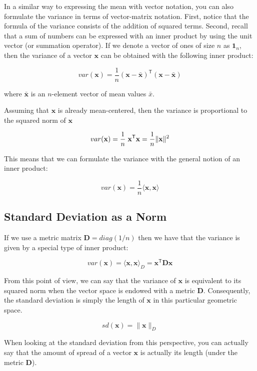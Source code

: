 \documentclass[]{book}
\begin{document}
In a similar way to expressing the mean with vector notation, you can also
formulate the variance in terms of vector-matrix notation. First, notice that
the formula of the variance consists of the addition of squared terms.
Second, recall that a sum of numbers can be expressed with an inner product by
using the unit vector (or summation operator). If we denote a vector of ones of
size \(n\) as \(\mathbf{1}_{n}\), then the variance of a vector \(\mathbf{x}\) can be
obtained with the following inner product:

\[
var(\mathbf{x}) = \frac{1}{n} (\mathbf{x} - \mathbf{\bar{x}})^\mathsf{T} (\mathbf{x} - \mathbf{\bar{x}})
\]

where \(\mathbf{\bar{x}}\) is an \(n\)-element vector of mean values \(\bar{x}\).

Assuming that \(\mathbf{x}\) is already mean-centered, then the variance is
proportional to the squared norm of \(\mathbf{x}\)

\[
var(\mathbf{x}) = \frac{1}{n} \hspace{1mm} \mathbf{x}^{\mathsf{T}} \mathbf{x} = \frac{1}{n} \| \mathbf{x} \|^2
\]

This means that we can formulate the variance with the general notion of an
inner product:

\[
var(\mathbf{x}) = \frac{1}{n} \langle \mathbf{x}, \mathbf{x} \rangle
\]

\hypertarget{standard-deviation-as-a-norm}{%
\subsection{Standard Deviation as a Norm}\label{standard-deviation-as-a-norm}}

If we use a metric matrix \(\mathbf{D} = diag(1/n)\) then we have that the variance
is given by a special type of inner product:

\[
var(\mathbf{x}) = \langle \mathbf{x}, \mathbf{x} \rangle_{D} = \mathbf{x}^{\mathsf{T}} \mathbf{D x}
\]

From this point of view, we can say that the variance of \(\mathbf{x}\) is
equivalent to its squared norm when the vector space is endowed with a metric
\(\mathbf{D}\). Consequently, the standard deviation is simply the length of
\(\mathbf{x}\) in this particular geometric space.

\[
sd(\mathbf{x}) = \| \mathbf{x} \|_{D}
\]

When looking at the standard deviation from this perspective, you can actually
say that the amount of spread of a vector \(\mathbf{x}\) is actually its length
(under the metric \(\mathbf{D}\)).
\end{document}
